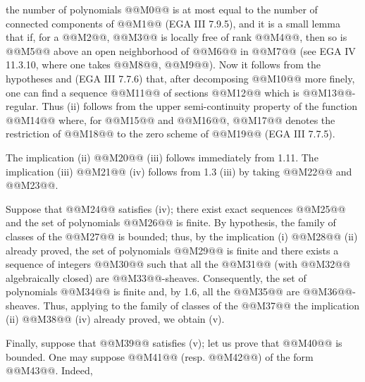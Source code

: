 the number of polynomials @@M0@@ is at most equal to the number of connected components of @@M1@@ (EGA III 7.9.5), and it is a small lemma that if, for a @@M2@@, @@M3@@ is locally free of rank @@M4@@, then so is @@M5@@ above an open neighborhood of @@M6@@ in @@M7@@ (see EGA IV 11.3.10, where one takes @@M8@@, @@M9@@). Now it follows from the hypotheses and (EGA III 7.7.6) that, after decomposing @@M10@@ more finely, one can find a sequence @@M11@@ of sections @@M12@@ which is @@M13@@-regular. Thus (ii) follows from the upper semi-continuity property of the function @@M14@@ where, for @@M15@@ and @@M16@@, @@M17@@ denotes the restriction of @@M18@@ to the zero scheme of @@M19@@ (EGA III 7.7.5).

The implication (ii) @@M20@@ (iii) follows immediately from 1.11. The implication (iii) @@M21@@ (iv) follows from 1.3 (iii) by taking @@M22@@ and @@M23@@.

Suppose that @@M24@@ satisfies (iv); there exist exact sequences
@@M25@@
and the set of polynomials @@M26@@ is finite. By hypothesis, the family of classes of the @@M27@@ is bounded; thus, by the implication (i) @@M28@@ (ii) already proved, the set of polynomials @@M29@@ is finite and there exists a sequence of integers @@M30@@ such that all the @@M31@@ (with @@M32@@ algebraically closed) are @@M33@@-sheaves. Consequently, the set of polynomials @@M34@@ is finite and, by 1.6, all the @@M35@@ are @@M36@@-sheaves. Thus, applying to the family of classes of the @@M37@@ the implication (ii) @@M38@@ (iv) already proved, we obtain (v).

Finally, suppose that @@M39@@ satisfies (v); let us prove that @@M40@@ is bounded. One may suppose @@M41@@ (resp. @@M42@@) of the form @@M43@@. Indeed,
